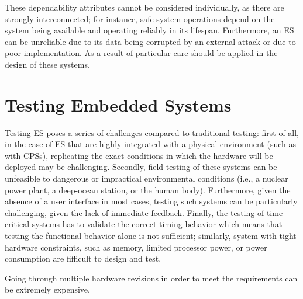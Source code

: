 These dependability attributes cannot be considered individually, as there are strongly interconnected; for instance, safe system operations depend on the system being available and operating reliably in its lifespan. Furthermore, an ES can be unreliable due to its data being corrupted by an external attack or due to poor implementation. As a result of particular care should be applied in the design of these systems. 





\section{Testing Embedded Systems}
Testing ES poses a series of challenges compared to traditional testing: first of all, in the case of ES that are highly integrated with a physical environment (such as with CPSs), replicating the exact conditions in which the hardware will be deployed may be challenging. Secondly, field-testing of these systems can be unfeasible to dangerous or impractical environmental conditions (i.e., a nuclear power plant, a deep-ocean station, or the human body). Furthermore, given the absence of a user interface in most cases, testing such systems can be particularly challenging, given the lack of immediate feedback. Finally, the testing of time-critical systems has to validate the correct timing behavior which means that testing the functional behavior alone is not sufficient; similarly, system with tight hardware constraints, such as memory, limited processor power, or power consumption are fifficult to design and test.

Going through multiple hardware revisions in order to meet the requirements can be extremely expensive.


